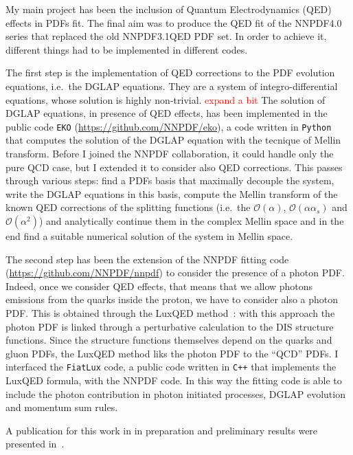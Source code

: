\documentclass[11pt,a4paper]{moderncv}        %
\begin{document}
My main project has been the inclusion of Quantum Electrodynamics (QED) effects in PDFs fit.
The final aim was to produce the QED fit of the NNPDF4.0 series that replaced the old NNPDF3.1QED PDF set.
In order to achieve it, different things had to be implemented in different codes.

The first step is the implementation of QED corrections to the PDF evolution equations, i.e.\ the DGLAP equations.
They are a system of integro-differential equations, whose solution is highly non-trivial. \textcolor{red}{expand a bit}
The solution of DGLAP equations, in presence of QED effects, has been implemented in the public code \texttt{EKO}
(\url{https://github.com/NNPDF/eko}), a code written in \texttt{Python} that computes the solution of the DGLAP equation with the
tecnique of Mellin transform.
Before I joined the NNPDF collaboration, it could handle only the pure QCD case, but I extended it to consider also QED corrections.
This passes through various steps: find a PDFs basis that maximally decouple the system, write the DGLAP equations in this basis,
compute the Mellin transform of the known QED corrections of the splitting functions
(i.e.\ the $\mathcal{O}(\alpha)$, $\mathcal{O}(\alpha \alpha_s)$ and $\mathcal{O}(\alpha^2)$) and analytically continue them in the complex Mellin space
and in the end find a suitable numerical solution of the system in Mellin space.

The second step has been the extension of the NNPDF fitting code (\url{https://github.com/NNPDF/nnpdf}) to consider the presence of
a photon PDF.
Indeed, once we consider QED effects, that means that we allow photons emissions from the quarks inside the proton, we have to consider also
a photon PDF.
This is obtained through the LuxQED method~\cite{Manohar:2016nzj, Manohar:2017eqh}: with this approach the photon PDF is linked through
a perturbative calculation to the DIS structure functions.
Since the structure functions themselves depend on the quarks and gluon PDFs, the LuxQED method liks the photon PDF to the ``QCD'' PDFs.
I interfaced the \texttt{FiatLux} code, a public code written in \texttt{C++} that implements the LuxQED formula, with the NNPDF code.
In this way the fitting code is able to include the photon contribution in photon initiated processes, DGLAP evolution and momentum sum rules.

A publication for this work in in preparation and preliminary results were presented in~\cite{LAURENTI2023}.
\end{document}
